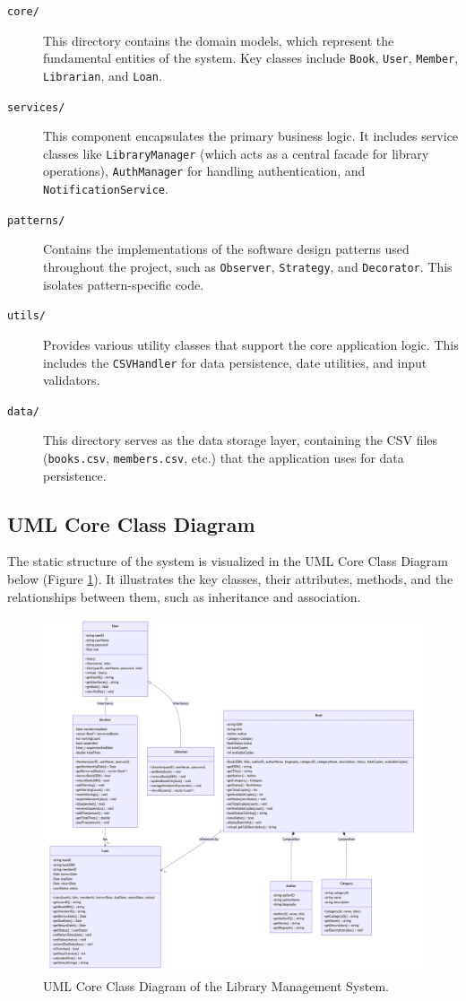 \begin{description}
    \item[\texttt{core/}] This directory contains the domain models, which represent the fundamental entities of the system. Key classes include \texttt{Book}, \texttt{User}, \texttt{Member}, \texttt{Librarian}, and \texttt{Loan}.
    \item[\texttt{services/}] This component encapsulates the primary business logic. It includes service classes like \texttt{LibraryManager} (which acts as a central facade for library operations), \texttt{AuthManager} for handling authentication, and \texttt{NotificationService}.
    \item[\texttt{patterns/}] Contains the implementations of the software design patterns used throughout the project, such as \texttt{Observer}, \texttt{Strategy}, and \texttt{Decorator}. This isolates pattern-specific code.
    \item[\texttt{utils/}] Provides various utility classes that support the core application logic. This includes the \texttt{CSVHandler} for data persistence, date utilities, and input validators.
    \item[\texttt{data/}] This directory serves as the data storage layer, containing the CSV files (\texttt{books.csv}, \texttt{members.csv}, etc.) that the application uses for data persistence.
\end{description}

\subsection{UML Core Class Diagram}
The static structure of the system is visualized in the UML Core Class Diagram below \cite{Booch2007} (Figure \ref{fig:class_diagram}). It illustrates the key classes, their attributes, methods, and the relationships between them, such as inheritance and association.

\begin{figure}[H]
    \centering
    \includegraphics[width=\textwidth]{figures/class_diagram.png}
    \caption{UML Core Class Diagram of the Library Management System.}
    \label{fig:class_diagram}
\end{figure}